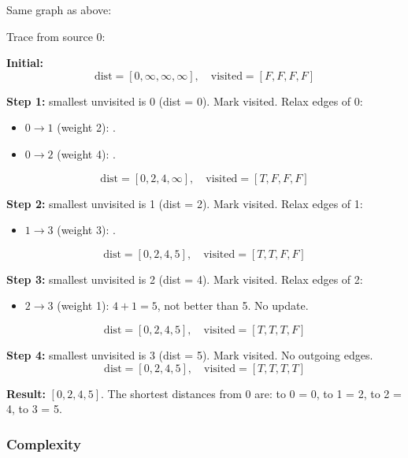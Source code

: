 \documentclass[11pt,a4paper]{article}
\newcommand{\code}[1]{\texttt{\detokenize{#1}}}
\begin{document}
Same graph as above:

\begin{center}
\end{center}

Trace from source 0:

\textbf{Initial:}
\[
\text{dist} = [0, \infty, \infty, \infty], \quad \text{visited} = [F, F, F, F]
\]

\textbf{Step 1:} smallest unvisited is 0 (dist = 0). Mark visited.
Relax edges of 0:
\begin{itemize}
    \item $0 \to 1$ (weight 2): \code{dist[1] = 0 + 2 = 2}.
    \item $0 \to 2$ (weight 4): \code{dist[2] = 0 + 4 = 4}.
\end{itemize}
\[
\text{dist} = [0, 2, 4, \infty], \quad \text{visited} = [T, F, F, F]
\]

\textbf{Step 2:} smallest unvisited is 1 (dist = 2). Mark visited.
Relax edges of 1:
\begin{itemize}
    \item $1 \to 3$ (weight 3): \code{dist[3] = 2 + 3 = 5}.
\end{itemize}
\[
\text{dist} = [0, 2, 4, 5], \quad \text{visited} = [T, T, F, F]
\]

\textbf{Step 3:} smallest unvisited is 2 (dist = 4). Mark visited.
Relax edges of 2:
\begin{itemize}
    \item $2 \to 3$ (weight 1): $4 + 1 = 5$, not better than 5. No update.
\end{itemize}
\[
\text{dist} = [0, 2, 4, 5], \quad \text{visited} = [T, T, T, F]
\]

\textbf{Step 4:} smallest unvisited is 3 (dist = 5). Mark visited.
No outgoing edges.
\[
\text{dist} = [0, 2, 4, 5], \quad \text{visited} = [T, T, T, T]
\]

\textbf{Result:} $[0, 2, 4, 5]$. The shortest distances from 0 are: to 0 = 0, to 1 = 2, to 2 = 4, to 3 = 5.

\subsubsection{Complexity}
\end{document}
